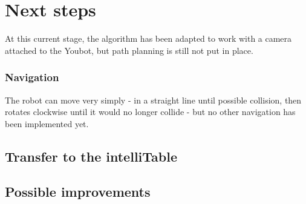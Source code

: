 \documentclass[1pt, oneside]{article}
\begin{document}
\section{Next steps}
At this current stage, the algorithm has been adapted to work with a camera attached to the Youbot, but path planning is still not put in place. 

\subsubsection*{Navigation}
The robot can move very simply - in a straight line until possible collision, then rotates clockwise until it would no longer collide - but no other navigation has been implemented yet.

\subsection{Transfer to the intelliTable}

\subsection{Possible improvements}

\clearpage

{}
\end{document}
